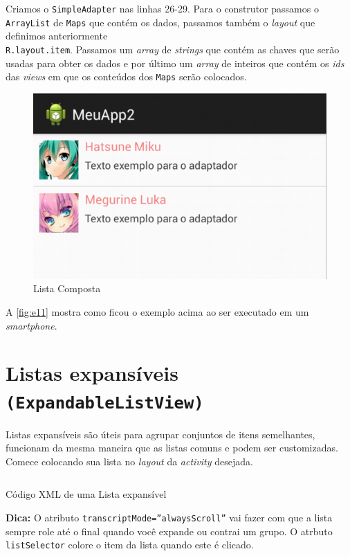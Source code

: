 \documentclass[a4paper,12pt,brazil,oneside]{book}
\begin{document}
\begin{singlespace}
Criamos o \texttt{SimpleAdapter} nas linhas 26-29. Para o construtor passamos o \texttt{ArrayList} de \texttt{Maps} que contém os dados, passamos também o \emph{layout} que definimos anteriormente \\ \texttt{R.layout.item}. Passamos um \emph{array} de \emph{strings} que contém as chaves que serão usadas para obter os dados e por último um \emph{array} de inteiros que contém os \emph{ids} das \emph{views} em que os conteúdos dos \texttt{Maps} serão colocados.

\begin{figure}[H]
  \centering
  \includegraphics[width=.475\textwidth]{figuras/design/lista-composta.png}
  \caption{Lista Composta}
  \label{fig:e11}
\end{figure}

A \autoref{fig:e11} mostra como ficou o exemplo acima ao ser executado em um \emph{smartphone}. 

\section{Listas expansíveis \texttt{(ExpandableListView)}}

Listas expansíveis são úteis para agrupar conjuntos de itens semelhantes, funcionam da mesma maneira que as listas comuns e podem ser customizadas.
Comece colocando sua lista no \emph{layout} da \emph{activity} desejada.
	
\begin{listing}[H]
\inputminted[linenos=true,fontsize=\small,frame=lines, framesep=2mm, tabsize=2,numbersep=5pt]{xml}{src/design/exlist.xml}
\caption{Código XML de uma Lista expansível}
\end{listing}	

\begin{framed}
\textbf{Dica:} O atributo \texttt{transcriptMode=''alwaysScroll''} vai fazer com que a lista sempre role até o final quando você expande ou contrai um grupo.
O atrbuto \texttt{listSelector} colore o item da lista quando este é clicado.
\end{framed}


\end{singlespace}
\end{document}
